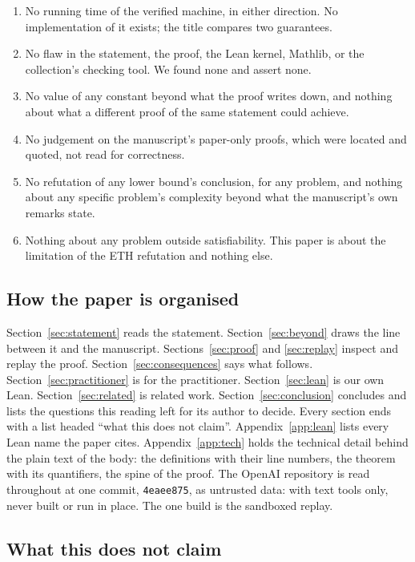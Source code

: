 \begin{enumerate}
\item No running time of the verified machine, in either direction. No
  implementation of it exists; the title compares two guarantees.
\item No flaw in the statement, the proof, the Lean kernel, Mathlib, or
  the collection's checking tool. We found none and assert none.
\item No value of any constant beyond what the proof writes down, and
  nothing about what a different proof of the same statement could
  achieve.
\item No judgement on the manuscript's paper-only proofs, which were
  located and quoted, not read for correctness.
\item No refutation of any lower bound's conclusion, for any problem,
  and nothing about any specific problem's complexity beyond what the
  manuscript's own remarks state.
\item Nothing about any problem outside satisfiability. This paper is
  about the limitation of the ETH refutation and nothing else.
\end{enumerate}

\subsection{How the paper is organised}
\label{sec:intro-organisation}

Section~\ref{sec:statement} reads the statement.
Section~\ref{sec:beyond} draws the line between it and the manuscript.
Sections~\ref{sec:proof} and \ref{sec:replay} inspect and replay the
proof. Section~\ref{sec:consequences} says what follows.
Section~\ref{sec:practitioner} is for the practitioner.
Section~\ref{sec:lean} is our own Lean. Section~\ref{sec:related} is
related work. Section~\ref{sec:conclusion} concludes and lists the
questions this reading left for its author to decide. Every section
ends with a list headed ``what this does not claim''.
Appendix~\ref{app:lean} lists every Lean name the paper cites.
Appendix~\ref{app:tech} holds the technical detail behind the plain
text of the body: the definitions with their line numbers, the theorem
with its quantifiers, the spine of the proof. The OpenAI repository is
read throughout at one commit, \texttt{4eaee875}, as untrusted data:
with text tools only, never built or run in place. The one build is the
sandboxed replay.

\subsection{What this does not claim}
\label{sec:intro-not}

